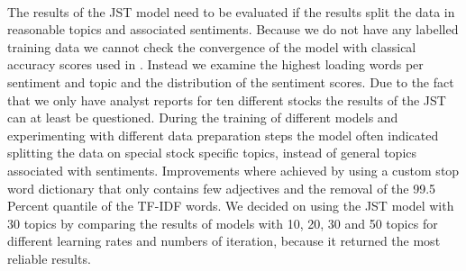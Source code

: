 
 \\
The results of the JST model need to be evaluated if the results split the data in reasonable topics and associated sentiments. Because we do not have any labelled training data we cannot check the convergence of the model with classical accuracy scores used in \citet{lin2009joint}. Instead we examine the highest loading words per sentiment and topic and the distribution of the sentiment scores. Due to the fact that we only have analyst reports for ten different stocks the results of the JST can at least be questioned. During the training of different models and experimenting with different data preparation steps the model often indicated splitting the data on special stock specific topics, instead of general topics associated with sentiments. Improvements where achieved by using a custom stop word dictionary that only contains few adjectives and the removal of the 99.5 Percent quantile of the TF-IDF words. We decided on using the JST model with 30 topics by comparing the results of models with 10, 20, 30 and 50 topics for different learning rates and numbers of iteration, because it returned the most reliable results. \\

